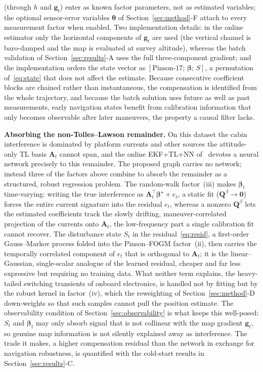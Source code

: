 \documentclass{IEEEtaes}
\begin{document}
(through $h$ and $\mathbf{g}_t$) enter as known factor parameters, not as
estimated variables; the optional sensor-error variables $\boldsymbol{\theta}$ of
Section~\ref{sec:method}-F attach to every measurement factor when enabled. Two
implementation details: in the online estimator only the horizontal components of
$\mathbf{g}_t$ are used (the vertical channel is baro-damped and the map is
evaluated at survey altitude), whereas the batch validation of
Section~\ref{sec:results}-A uses the full three-component gradient; and the
implementation orders the state vector as
$[\text{Pinson-17};\,\boldsymbol{\beta};\,S]$, a permutation of~\eqref{eq:state}
that does not affect the estimate.
Because consecutive coefficient blocks are chained rather than instantaneous,
the compensation is identified from the whole trajectory, and because the batch
solution uses future as well as past measurements, early navigation states benefit
from calibration information that only becomes observable after later
maneuvers, the property a causal filter lacks.

\smallskip\noindent\textbf{Absorbing the non-Tolles--Lawson remainder.}
On this dataset the cabin interference is dominated by platform currents and other
sources the attitude-only TL basis $\mathbf{A}_t$ cannot span, and the online
EKF+TL+NN of~\cite{hager2026} devotes a neural network precisely to this remainder.
The proposed graph carries no network; instead three of the factors above combine
to absorb the remainder as a structured, robust regression problem. The
random-walk factor~(iii) makes $\boldsymbol{\beta}_t$ time-varying: writing
the true interference as $\mathbf{A}_t^{\top}\boldsymbol{\beta}^\star+e_t$, a static
fit ($\mathbf{Q}^{\beta}\!\to\!\mathbf{0}$) forces the entire current signature
into the residual $e_t$, whereas a nonzero $\mathbf{Q}^{\beta}$ lets the estimated
coefficients track the slowly drifting, maneuver-correlated projection of the
currents onto $\mathbf{A}_t$, the low-frequency part a single calibration fit
cannot recover. The disturbance state $S_t$ in the residual~\eqref{eq:resid}, a
first-order Gauss--Markov process folded into the Pinson--FOGM factor~(ii), then
carries the temporally correlated component of $e_t$ that is orthogonal to
$\mathbf{A}_t$; it is the linear--Gaussian, single-scalar analogue of the learned
residual, cheaper and far less expressive but requiring no training data. What
neither term explains, the heavy-tailed switching transients of onboard
electronics, is handled not by fitting but by the robust kernel in factor~(iv),
which the reweighting of Section~\ref{sec:method}-D down-weights so that such
samples cannot pull the position estimate. The observability condition of
Section~\ref{sec:observability} is what keeps this well-posed: $S_t$ and
$\boldsymbol{\beta}_t$ may only absorb signal that is not collinear with the
map gradient $\mathbf{g}_t$, so genuine map information is not silently explained
away as interference. The trade it makes, a higher compensation residual than the
network in exchange for navigation robustness, is quantified with the cold-start
results in Section~\ref{sec:results}-C.
\end{document}
